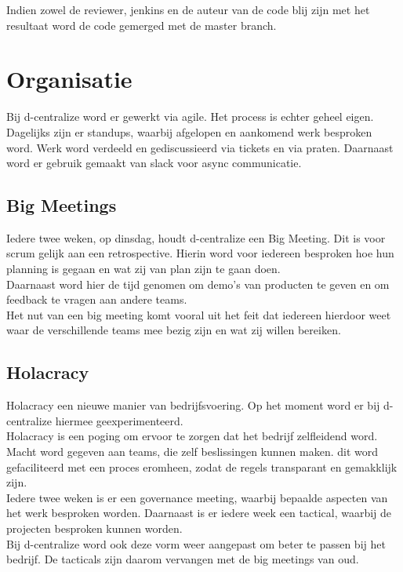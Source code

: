 Indien zowel de reviewer, jenkins en de auteur van de code blij zijn met het resultaat word de code gemerged met de master branch.

\section{Organisatie}

Bij d-centralize word er gewerkt via agile. Het process is echter geheel eigen. Dagelijks zijn er standups, waarbij afgelopen en aankomend werk besproken word. Werk word verdeeld en gediscussieerd via tickets en via praten. Daarnaast word er gebruik gemaakt van slack voor async communicatie. 

\subsection{Big Meetings}

Iedere twee weken, op dinsdag, houdt d-centralize een Big Meeting. Dit is voor scrum gelijk aan een retrospective. Hierin word voor iedereen besproken hoe hun planning is gegaan en wat zij van plan zijn te gaan doen. \\

Daarnaast word hier de tijd genomen om demo's van producten te geven en om feedback te vragen aan andere teams. \\

Het nut van een big meeting komt vooral uit het feit dat iedereen hierdoor weet waar de verschillende teams mee bezig zijn en wat zij willen bereiken.

\subsection{Holacracy}

Holacracy een nieuwe manier van bedrijfsvoering. Op het moment word er bij d-centralize hiermee geexperimenteerd. \\ 

Holacracy is een poging om ervoor te zorgen dat het bedrijf zelfleidend word. Macht word gegeven aan teams, die zelf beslissingen kunnen maken. dit word gefaciliteerd met een proces eromheen, zodat de regels transparant en gemakklijk zijn. \\

Iedere twee weken is er een governance meeting, waarbij bepaalde aspecten van het werk besproken worden. Daarnaast is er iedere week een tactical, waarbij de projecten besproken kunnen worden. \\

Bij d-centralize word ook deze vorm weer aangepast om beter te passen bij het bedrijf. De tacticals zijn daarom vervangen met de big meetings van oud.